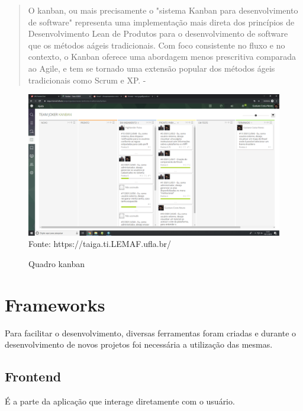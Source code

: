   \begin{quote}
    O kanban, ou mais precisamente o "sistema Kanban para desenvolvimento de software" representa uma implementação mais direta dos princípios de Desenvolvimento Lean de Produtos para o desenvolvimento de software que os métodos aágeis tradicionais. Com foco consistente no fluxo e no contexto, o Kanban oferece uma abordagem menos prescritiva comparada ao Agile, e tem se tornado uma extensão popular dos métodos ágeis tradicionais como Scrum e XP. - \cite{boeg2010kanban}
  \end{quote}
\begin{figure}[H]
\centering
\caption{Quadro kanban} %
\includegraphics[scale=0.2]{quadroKanban}\\  %
{\small Fonte: https://taiga.ti.LEMAF.ufla.br/} %
\label{fig:exemplo} %
\end{figure}

\section{Frameworks}

Para facilitar o desenvolvimento, diversas ferramentas foram criadas e durante o desenvolvimento de novos projetos foi necessária a utilização das mesmas.

\subsection{Frontend}

É a parte da aplicação que interage diretamente com o usuário.

